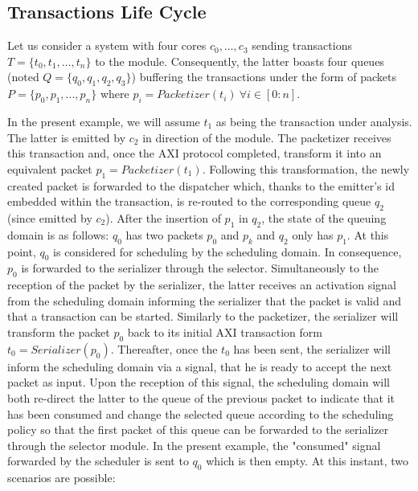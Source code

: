         \subsection{Transactions Life Cycle}
            \label{subsec:transaction-life-cycle}

            Let us consider a system with four cores $c_0, \ldots, c_3$ sending
            transactions $T = \{t_{0}, t_{1}, ..., t_{n}\}$ to the \schim module.
            Consequently, the latter boasts four queues (noted $Q = \{q_{0},
            q_{1}, q_{2}, q_{3}\}$) buffering the transactions under the form of
            packets $P = \{p_{0}, p_{1}, ..., p_{n}\}$ where $p_{i} =
            Packetizer(t_{i})~\forall i \in [0 : n]$.

            In the present example, we will assume $t_{1}$ as being the
            transaction under analysis.  The latter is emitted by $c_{2}$ in
            direction of the \schim module.  The packetizer receives this
            transaction and, once the AXI protocol completed, transform it into an
            equivalent packet $p_{1} = Packetizer(t_{1})$.  Following this
            transformation, the newly created packet is forwarded to the
            dispatcher which, thanks to the emitter's id embedded within the
            transaction, is re-routed to the corresponding queue $q_{2}$ (since
            emitted by $c_{2}$).  After the insertion of $p_{1}$ in $q_{2}$, the
            state of the queuing domain is as follows: $q_{0}$ has two packets
            $p_{0}$ and $p_{k}$ and $q_{2}$ only has $p_{1}$.  At this point,
            $q_{0}$ is considered for scheduling by the scheduling domain.  In
            consequence, $p_{0}$ is forwarded to the serializer through the
            selector.  Simultaneously to the reception of the packet by the
            serializer, the latter receives an activation signal from the
            scheduling domain informing the serializer that the packet is valid
            and that a transaction can be started.  Similarly to the packetizer,
            the serializer will transform the packet $p_{0}$ back to its initial
            AXI transaction form $t_{0} = Serializer(p_{0})$.  Thereafter, once
            the $t_{0}$ has been sent, the serializer will inform the scheduling
            domain via a signal, that he is ready to accept the next packet as
            input.  Upon the reception of this signal, the scheduling domain will
            both re-direct the latter to the queue of the previous packet to
            indicate that it has been consumed and change the selected queue
            according to the scheduling policy so that the first packet of this
            queue can be forwarded to the serializer through the selector module.
            In the present example, the "consumed" signal forwarded by the
            scheduler is sent to $q_{0}$ which is then empty.  At this instant,
            two scenarios are possible:


